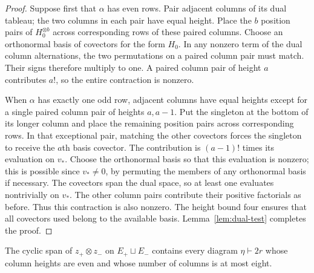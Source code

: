 \begin{proof}
Suppose first that $\alpha$ has even rows.  Pair adjacent columns
of its dual tableau; the two columns in each pair have equal
height.  Place the $b$ position pairs of $H_0^{\otimes b}$
across corresponding rows of these paired columns.  Choose an
orthonormal basis of covectors for the form $H_0$.
In any nonzero term of the dual column alternations, the two
permutations on a paired column pair must match.  Their signs
therefore multiply to one.  A paired column pair of height $a$
contributes $a!$, so the entire contraction is nonzero.

When $\alpha$ has exactly one odd row, adjacent columns have
equal heights except for a single paired column pair of heights
$a,a-1$.  Put the singleton at the bottom of its longer column
and place the remaining position pairs across corresponding
rows.  In that exceptional pair, matching the other covectors
forces the singleton to receive the $a$th basis covector.
The contribution is $(a-1)!$ times its evaluation on $v_*$.
Choose the orthonormal basis so that this evaluation is nonzero;
this is possible since $v_*\ne0$, by permuting the members of
any orthonormal basis if necessary.  The covectors span the dual
space, so at least one evaluates nontrivially on $v_*$.  The other
column pairs contribute their positive factorials as before.  Thus this
contraction is also nonzero.  The height bound four ensures that
all covectors used belong to the available basis.
Lemma~\ref{lem:dual-test} completes the proof.
\end{proof}

\begin{lemma}\label{band:two-extras}
The cyclic span of $z_+\otimes z_-$ on $E_+\sqcup E_-$ contains
every diagram $\eta\vdash 2r$ whose column heights are even and
whose number of columns is at most eight.
\end{lemma}

